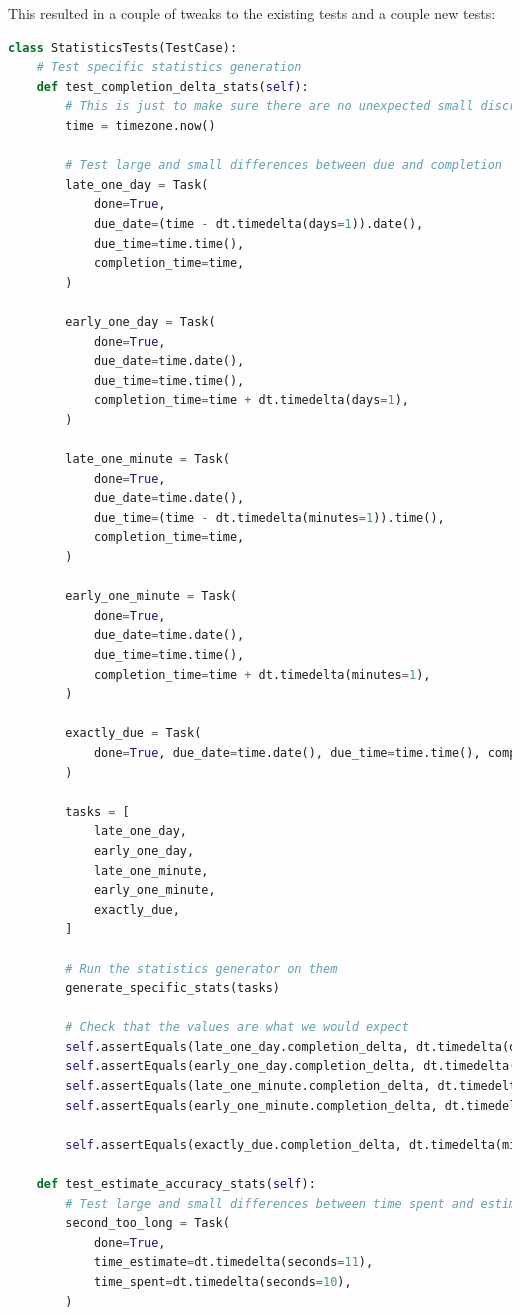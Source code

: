 \documentclass{article}
\begin{document}
This resulted in a couple of tweaks to the existing tests and a couple new tests:
\begin{lstlisting}[language=Python]
class StatisticsTests(TestCase):
    # Test specific statistics generation
    def test_completion_delta_stats(self):
        # This is just to make sure there are no unexpected small discretions in timings
        time = timezone.now()

        # Test large and small differences between due and completion
        late_one_day = Task(
            done=True,
            due_date=(time - dt.timedelta(days=1)).date(),
            due_time=time.time(),
            completion_time=time,
        )

        early_one_day = Task(
            done=True,
            due_date=time.date(),
            due_time=time.time(),
            completion_time=time + dt.timedelta(days=1),
        )

        late_one_minute = Task(
            done=True,
            due_date=time.date(),
            due_time=(time - dt.timedelta(minutes=1)).time(),
            completion_time=time,
        )

        early_one_minute = Task(
            done=True,
            due_date=time.date(),
            due_time=time.time(),
            completion_time=time + dt.timedelta(minutes=1),
        )

        exactly_due = Task(
            done=True, due_date=time.date(), due_time=time.time(), completion_time=time,
        )

        tasks = [
            late_one_day,
            early_one_day,
            late_one_minute,
            early_one_minute,
            exactly_due,
        ]

        # Run the statistics generator on them
        generate_specific_stats(tasks)

        # Check that the values are what we would expect
        self.assertEquals(late_one_day.completion_delta, dt.timedelta(days=1))
        self.assertEquals(early_one_day.completion_delta, dt.timedelta(days=1))
        self.assertEquals(late_one_minute.completion_delta, dt.timedelta(minutes=1))
        self.assertEquals(early_one_minute.completion_delta, dt.timedelta(minutes=1))

        self.assertEquals(exactly_due.completion_delta, dt.timedelta(minutes=0))

    def test_estimate_accuracy_stats(self):
        # Test large and small differences between time spent and estimated
        second_too_long = Task(
            done=True,
            time_estimate=dt.timedelta(seconds=11),
            time_spent=dt.timedelta(seconds=10),
        )


\end{lstlisting}
\end{document}
